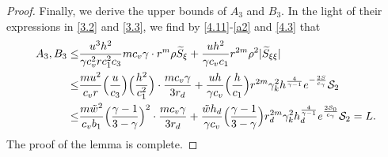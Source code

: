 \documentclass[11pt,reqno]{article}
\newcommand{\fr}{\frac}
\numberwithin{equation}{section}
\begin{document}
\begin{proof}
Finally, we derive the upper bounds of $A_3$ and $B_3$. In the light of their expressions in \eqref{3.2} and \eqref{3.3}, we find by \eqref{4.11}-\eqref{a2} and \eqref{4.3} that
\begin{align}\label{a5}
A_3,B_{3}\leq & \fr{u^3h^2}{\gamma c_{v}^2 r c_{1}^2 c_{3}}mc_v\gamma \cdot r^m\rho \widetilde{S}_\xi +\fr{uh^2}{\gamma c_v c_1}r^{2m}\rho^2|\widetilde{S}_{\xi\xi}| \notag \\
\leq & \fr{mu^2}{c_{v} r} \Big(\fr{u}{c_3}\Big)\Big(\fr{h^2}{c_{1}^2}\Big)\cdot\fr{mc_v\gamma}{3r_d} +\fr{uh}{\gamma c_v }\Big(\fr{h}{c_1}\Big)r^{2m}\gamma_{k}^2h^{\fr{4}{\gamma-1}}e^{-\fr{2S}{c_\gamma}}\mathcal{S}_2  \notag \\
\leq & \fr{m\tilde{w}^2}{c_{v} b_1}\Big(\fr{\gamma-1}{3-\gamma}\Big)^2\cdot\fr{mc_v\gamma}{3r_d} +\fr{\tilde{w}h_d}{\gamma c_v }\Big(\fr{\gamma-1}{3-\gamma}\Big)r_{d}^{2m}\gamma_{k}^2h_{d}^{\fr{4}{\gamma-1}} e^{\fr{2\mathcal{S}_0}{c_\gamma}}\mathcal{S}_2=L.
\end{align}
The proof of the lemma is complete.
\end{proof}
\end{document}
